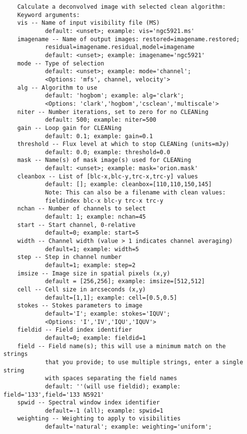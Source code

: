 \small
\begin{verbatim}    
    Calculate a deconvolved image with selected clean algorithm:
    Keyword arguments:
    vis -- Name of input visibility file (MS)
            default: <unset>; example: vis='ngc5921.ms'
    imagename -- Name of output images: restored=imagename.restored;
            residual=imagename.residual,model=imagename
            default: <unset>; example: imagename='ngc5921'
    mode -- Type of selection 
            default: <unset>; example: mode='channel'; 
            <Options: 'mfs', channel, velocity'>
    alg -- Algorithm to use
            default: 'hogbom'; example: alg='clark'; 
            <Options: 'clark','hogbom','csclean','multiscale'>
    niter -- Number iterations, set to zero for no CLEANing
            default: 500; example: niter=500
    gain -- Loop gain for CLEANing
            default: 0.1; example: gain=0.1
    threshold -- Flux level at which to stop CLEANing (units=mJy)
            default: 0.0; example: threshold=0.0
    mask -- Name(s) of mask image(s) used for CLEANing
            default: <unset>; example: mask='orion.mask'
    cleanbox -- List of [blc-x,blc-y,trc-x,trc-y] values
            default: []; example: cleanbox=[110,110,150,145]
            Note: This can also be a filename with clean values:
            fieldindex blc-x blc-y trc-x trc-y
    nchan -- Number of channels to select
            default: 1; example: nchan=45
    start -- Start channel, 0-relative
            default=0; example: start=5
    width -- Channel width (value > 1 indicates channel averaging)
            default=1; example: width=5
    step -- Step in channel number
            default=1; example: step=2      
    imsize -- Image size in spatial pixels (x,y)
            default = [256,256]; example: imsize=[512,512]
    cell -- Cell size in arcseconds (x,y)
            default=[1,1]; example: cell=[0.5,0.5]
    stokes -- Stokes parameters to image
            default='I'; example: stokes='IQUV'; 
            <Options: 'I','IV','IQU','IQUV'>
    fieldid -- Field index identifier
            default=0; example: fieldid=1
    field -- Field name(s); this will use a minimum match on the strings
            that you provide; to use multiple strings, enter a single string
            with spaces separating the field names
            default: ''(will use fieldid); example: field='133',field='133 N5921'
    spwid -- Spectral window index identifier
            default=-1 (all); example: spwid=1
    weighting -- Weighting to apply to visibilities
            default='natural'; example: weighting='uniform'; 

\end{verbatim}
